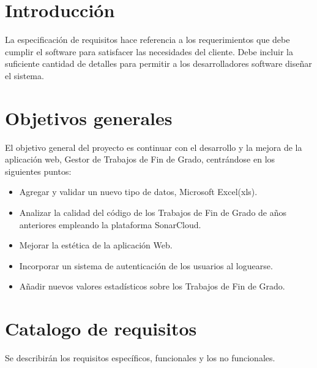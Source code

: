 
\section{Introducción}
La especificación de requisitos hace referencia a los requerimientos que debe cumplir el software para satisfacer las necesidades del cliente. Debe incluir la suficiente cantidad de detalles para permitir a los desarrolladores software diseñar el sistema.

\section{Objetivos generales}
El objetivo general del proyecto es continuar con el desarrollo y la mejora de la aplicación web, Gestor de Trabajos de Fin de Grado, centrándose en los siguientes puntos:
\begin{itemize}
	\item Agregar y validar un nuevo tipo de datos, Microsoft Excel(xls).	
	\item Analizar la calidad del código de los Trabajos de Fin de Grado de años anteriores empleando la plataforma SonarCloud.
	\item Mejorar la estética de la aplicación Web.
	\item Incorporar un sistema de autenticación de los usuarios al loguearse.
	\item Añadir nuevos valores estadísticos sobre los Trabajos de Fin de Grado. 
\end{itemize}

\section{Catalogo de requisitos}
Se describirán los requisitos específicos, funcionales y los no funcionales.

